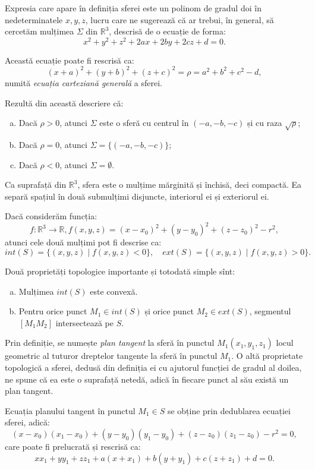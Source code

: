 Expresia care apare în definiția sferei este un polinom de gradul doi în
nedeterminatele $x, y, z$, lucru care ne sugerează că ar trebui, în general,
să cercetăm mulțimea $\Sigma$ din $\mathbb{R}^3$, descrisă de o ecuație
de forma: 
 \[
	x^2 + y^2 + z^2 + 2ax + 2by + 2cz + d = 0.
\]

Această ecuație poate fi rescrisă ca: 
 \[
	(x + a)^2 + (y + b)^2 + (z + c)^2 = \rho = a^2 + b^2 + c^2 - d,
\]
numită \emph{ecuația carteziană generală} a sferei.

Rezultă din această descriere că:
\begin{enumerate}[(a)]
	\item Dacă $\rho > 0$, atunci $\Sigma$ este o sferă cu centrul în 
$(-a, -b, -c)$ și cu raza $\sqrt{\rho}$;
    \item Dacă $\rho = 0$, atunci $\Sigma = \{(-a, -b, -c)\}$;
    \item Dacă $\rho < 0$, atunci $\Sigma = \emptyset$.
\end{enumerate}

Ca suprafață din $\mathbb{R}^3$, sfera este o mulțime mărginită și închisă,
deci compactă. Ea separă spațiul în două submulțimi disjuncte, interiorul ei și
exteriorul ei. 

Dacă considerăm funcția: 
 \[
	f : \mathbb{R}^3 \to \mathbb{R},
	f(x, y, z) = (x - x_0)^2 + (y - y_0)^2 + (z - z_0)^2 - r^2,
\]
atunci cele două mulțimi pot fi descrise ca: 
 \[
	int(S) = \{(x, y, z) \mid f(x, y, z) < 0 \}, \quad
	ext(S) = \{(x, y, z) \mid f(x, y, z) > 0 \}.
\]

Două proprietăți topologice importante și totodată simple sînt:
\begin{theorem}
\begin{enumerate}[(a)]
	\item Mulțimea $int(S)$ este convexă.
	\item Pentru orice punct $M_1 \in int(S)$ și orice punct $M_2 \in ext(S)$,
segmentul $[M_1M_2]$ intersectează pe $S$.
\end{enumerate} 
\end{theorem}

Prin definiție, se numește \emph{plan tangent} la sferă în punctul 
$M_1(x_1, y_1, z_1)$ locul geometric al tuturor dreptelor tangente la sferă
în punctul $M_1$. O altă proprietate topologică a sferei, dedusă din definiția
ei cu ajutorul funcției de gradul al doilea, ne spune că ea este o suprafață
netedă, adică în fiecare punct al său există un plan tangent.

Ecuația planului tangent în punctul $M_1 \in S$ se obține prin dedublarea
ecuației sferei, adică: 
 \[
(x - x_0)(x_1 - x_0) + (y - y_0)(y_1 - y_0) + (z - z_0)(z_1 - z_0) - r^2 = 0,
\]
care poate fi prelucrată și rescrisă ca: 
 \[
	xx_1 + yy_1 + zz_1 + a(x + x_1) + b(y + y_1) + c(z + z_1) + d = 0.
\]

